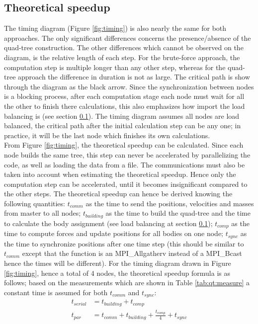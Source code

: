 \subsection{Theoretical speedup}
The timing diagram (Figure \ref{fig:timing}) is also nearly the same for both approaches. The only significant differences concerns the presence/absence of the quad-tree construction. The other differences which cannot be observed on the diagram, is the relative length of each step. For the brute-force approach, the computation step is multiple longer than any other step, whereas for the quad-tree approach the difference in duration is not as large. The critical path is show through the diagram as the black arrow. Since the synchronization between nodes is a blocking process, after each computation stage each node must wait for all the other to finish there calculations, this also emphasizes how import the load balancing is (see section \ref{}). The timing diagram assumes all nodes are load balanced, the critical path after the initial calculation step can be any one; in practice, it will be the last node which finishes its own calculations.\\
From Figure \ref{fig:timing}, the theoretical speedup can be calculated. Since each node builds the same tree, this step can never be accelerated by parallelizing the code, as well as loading the data from a file. The communications must also be taken into account when estimating the theoretical speedup. Hence only the computation step can be accelerated, until it becomes insignificant compared to the other steps. The theoretical speedup can hence be derived knowing the following quantities: $t_{comm}$ as the time to send the positions, velocities and masses from master to all nodes; $t_{building}$ as the time to build the quad-tree and the time to calculate the body assignment (see load balancing at section \ref{}); $t_{comp}$ as the time to compute forces and update positions for all bodies on one node; $t_{sync}$ as the time to synchronize positions after one time step (this should be similar to $t_{comm}$ except that the function is an MPI\_Allgatherv instead of a MPI\_Bcast hence the times will be different). For the timing diagram drawn in Figure \ref{fig:timing}, hence a total of 4 nodes, the theoretical speedup formula is as follows; based on the measurements which are shown in Table \ref{tab:qt:measure} a constant time is assumed for both $t_{comm}$ and $t_{sync}$:
\begin{align}
t_{serial}& = t_{building} + t_{comp}\\
t_{par} &= t_{comm} + t_{building } + \frac{t_{comp}}{4} + t_{sync}
\end{align}
